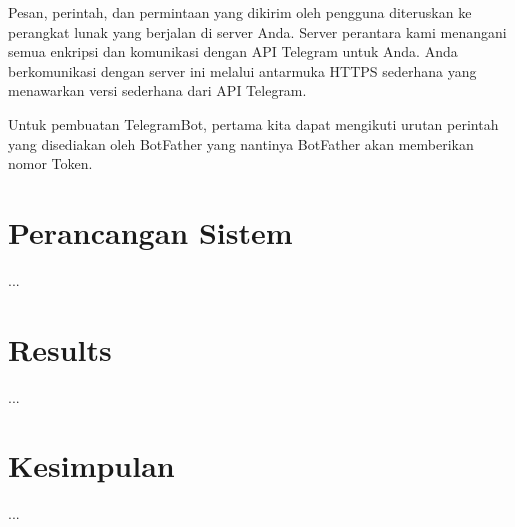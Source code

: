 \documentclass[conference]{IEEEtran}
\begin{document}
Pesan, perintah, dan permintaan yang dikirim oleh pengguna diteruskan ke perangkat lunak yang berjalan di server Anda. Server perantara kami menangani semua enkripsi dan komunikasi dengan API Telegram untuk Anda. Anda berkomunikasi dengan server ini melalui antarmuka HTTPS sederhana yang menawarkan versi sederhana dari API Telegram.

Untuk pembuatan TelegramBot, pertama kita dapat mengikuti urutan perintah yang disediakan oleh BotFather yang nantinya BotFather akan memberikan nomor Token.

\section{Perancangan Sistem}
...

\section{Results}
...

\section{Kesimpulan}
...



\end{document}
